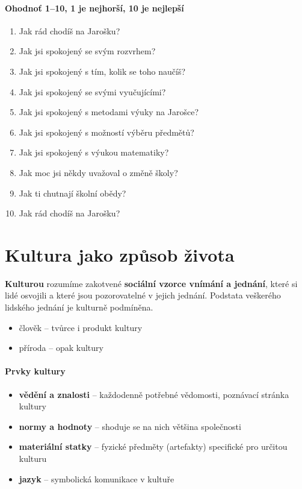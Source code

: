 \paragraph{Ohodnoť 1--10, 1 je nejhorší, 10 je nejlepší}
\begin{enumerate}
\item Jak rád chodíš na Jarošku?
\item Jak jsi spokojený se svým rozvrhem?
\item Jak jsi spokojený s tím, kolik se toho naučíš?
\item Jak jsi spokojený se svými vyučujícími?
\item Jak jsi spokojený s metodami výuky na Jarošce?
\item Jak jsi spokojený s možností výběru předmětů?
\item Jak jsi spokojený s výukou matematiky?
\item Jak moc jsi někdy uvažoval o změně školy?
\item Jak ti chutnají školní obědy?
\item Jak rád chodíš na Jarošku?
\end{enumerate}




\section{Kultura jako způsob života}
\textbf{Kulturou} rozumíme zakotvené \textbf{sociální vzorce vnímání a jednání}, které si lidé osvojili a které jsou pozorovatelné v jejich jednání. Podstata veškerého lidského jednání je kulturně podmíněna.
\begin{itemize}
\item člověk -- tvůrce i produkt kultury
\item příroda -- opak kultury
\end{itemize}

\paragraph{Prvky kultury}
\begin{itemize}
\item \textbf{vědění a znalosti} -- každodenně potřebné vědomosti, poznávací stránka kultury
\item \textbf{normy a hodnoty} -- shoduje se na nich většina společnosti
\item \textbf{materiální statky} -- fyzické předměty (artefakty) specifické pro určitou kulturu
\item \textbf{jazyk} -- symbolická komunikace v kultuře
\end{itemize}

